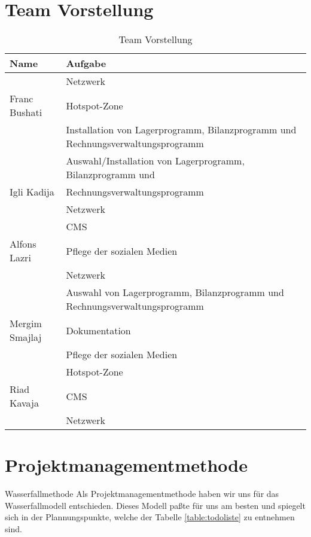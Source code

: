 \section{Team Vorstellung}
\begin{table}[ht]
\caption{Team Vorstellung}
\hspace*{-2cm}
\begin{tabular}{l l}
\hline\hline
Name & Aufgabe \\ [0.5ex]
\hline
    		   & Netzwerk \\
Franc Bushati  & Hotspot-Zone \\
    		   & Installation von Lagerprogramm, Bilanzprogramm und Rechnungsverwaltungsprogramm \\
\hline
               & Auswahl/Installation von Lagerprogramm, Bilanzprogramm und  \\
Igli Kadija	   & Rechnungsverwaltungsprogramm \\
    		   & Netzwerk \\
\hline    		   
               & CMS \\
Alfons Lazri   & Pflege der sozialen Medien \\
    		   & Netzwerk \\
\hline    		   
			   & Auswahl von Lagerprogramm, Bilanzprogramm und Rechnungsverwaltungsprogramm \\
Mergim Smajlaj & Dokumentation \\
    		   & Pflege der sozialen Medien \\
\hline    		   
      	       & Hotspot-Zone \\
Riad Kavaja	   & CMS \\	
    		   & Netzwerk \\
\hline
\end{tabular}
\label{table:teamvorstellung} 
\end{table}


\section{Projektmanagementmethode}
Wasserfallmethode
Als Projektmanagementmethode haben wir uns f\"ur das Wasserfallmodell entschieden. Dieses Modell pa{\ss}te f\"ur uns am besten und spiegelt sich in der Plannungspunkte, welche der Tabelle \ref{table:todoliste} zu entnehmen sind.